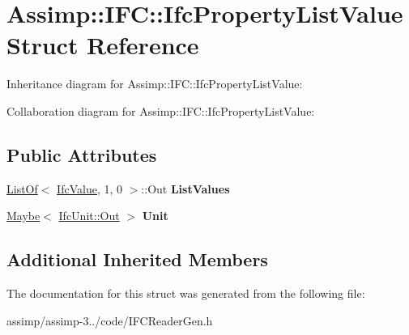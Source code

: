 \hypertarget{struct_assimp_1_1_i_f_c_1_1_ifc_property_list_value}{\section{Assimp\+:\+:I\+F\+C\+:\+:Ifc\+Property\+List\+Value Struct Reference}
\label{struct_assimp_1_1_i_f_c_1_1_ifc_property_list_value}
}


Inheritance diagram for Assimp\+:\+:I\+F\+C\+:\+:Ifc\+Property\+List\+Value\+:


Collaboration diagram for Assimp\+:\+:I\+F\+C\+:\+:Ifc\+Property\+List\+Value\+:
\subsection*{Public Attributes}
\begin{DoxyCompactItemize}
\item 
\hypertarget{struct_assimp_1_1_i_f_c_1_1_ifc_property_list_value_a539b2a60c657b58c95f25eb0b62e7f6a}{\hyperlink{struct_assimp_1_1_s_t_e_p_1_1_list_of}{List\+Of}$<$ \hyperlink{class_assimp_1_1_s_t_e_p_1_1_e_x_p_r_e_s_s_1_1_data_type}{Ifc\+Value}, 1, 0 $>$\+::Out {\bfseries List\+Values}}\label{struct_assimp_1_1_i_f_c_1_1_ifc_property_list_value_a539b2a60c657b58c95f25eb0b62e7f6a}

\item 
\hypertarget{struct_assimp_1_1_i_f_c_1_1_ifc_property_list_value_acf67a97dbd666837c0b51346da714807}{\hyperlink{struct_assimp_1_1_s_t_e_p_1_1_maybe}{Maybe}$<$ \hyperlink{classboost_1_1shared__ptr}{Ifc\+Unit\+::\+Out} $>$ {\bfseries Unit}}\label{struct_assimp_1_1_i_f_c_1_1_ifc_property_list_value_acf67a97dbd666837c0b51346da714807}

\end{DoxyCompactItemize}
\subsection*{Additional Inherited Members}


The documentation for this struct was generated from the following file\+:\begin{DoxyCompactItemize}
\item 
assimp/assimp-\/3../code/I\+F\+C\+Reader\+Gen.\+h\end{DoxyCompactItemize}
